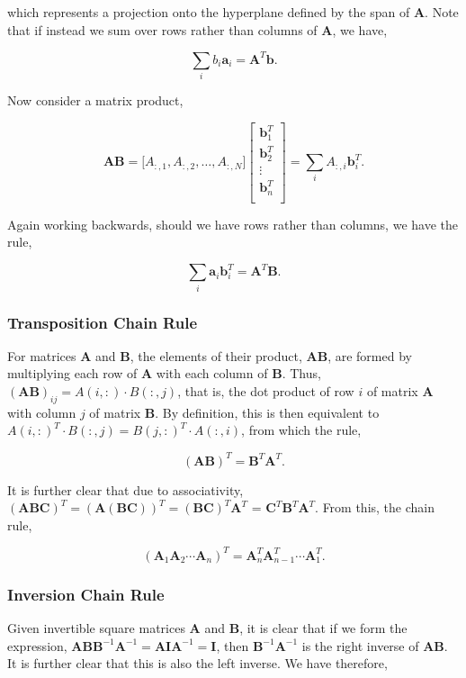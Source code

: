 \documentclass[11pt]{amsart}
\begin{document}
which represents a projection onto the hyperplane defined by the span of $\mathbf{A}$. Note that if instead we sum over rows rather than columns of $\mathbf{A}$, we have,

$$\sum_{i} b_i\mathbf{a}_i = \mathbf{A}^T\mathbf{b}.$$

Now consider a matrix product,

$$\mathbf{A}\mathbf{B} = \big[A_{:, 1}, A_{:, 2}, \dots, A_{:, N}\big]
\begin{bmatrix}
\mathbf{b}_1^T \\
\mathbf{b}_2^T \\
\vdots \\
\mathbf{b}_n^T \\
\end{bmatrix}
= \sum_{i} A_{:, i}\mathbf{b}_i^T.
$$

Again working backwards, should we have rows rather than columns, we have the rule,

$$\sum_{i} \mathbf{a}_i\mathbf{b}_i^T = \mathbf{A}^T\mathbf{B}.$$

\subsubsection{Transposition Chain Rule}

For matrices \textbf{A} and \textbf{B}, the elements of their product, \textbf{AB}, are formed by multiplying each row of \textbf{A} with each column of \textbf{B}. Thus, $(\textbf{AB})_{ij} = A(i, :) \cdot B(:, j)$, that is, the dot product of row $i$ of matrix \textbf{A} with column $j$ of matrix \textbf{B}. By definition, this is then equivalent to $A(i, :)^T \cdot B(:, j)= B(j, :)^T \cdot A(:,i)$, from which the rule,

$$(\mathbf{AB})^T = \mathbf{B}^T\mathbf{A}^T.$$

It is further clear that due to associativity, $(\mathbf{ABC})^T = (\mathbf{A(BC)})^T = (\mathbf{BC})^T\mathbf{A}^T$ = $\mathbf{C}^T\mathbf{B}^T\mathbf{A}^T$. From this, the chain rule,

$$(\mathbf{A}_1\mathbf{A}_2\cdots \mathbf{A}_n)^T = \mathbf{A}_n^T\mathbf{A}_{n-1}^T\cdots\mathbf{A}_1^T.$$

\subsubsection{Inversion Chain Rule}

Given invertible square matrices \textbf{A} and \textbf{B}, it is clear that if we form the expression, $\mathbf{AB}\mathbf{B}^{-1}\mathbf{A}^{-1} = \mathbf{A}\mathbf{I}\mathbf{A}^{-1} = \mathbf{I}$, then $\mathbf{B}^{-1}\mathbf{A}^{-1}$ is the right inverse of $\mathbf{AB}$. It is further clear that this is also the left inverse. We have therefore,
\end{document}
